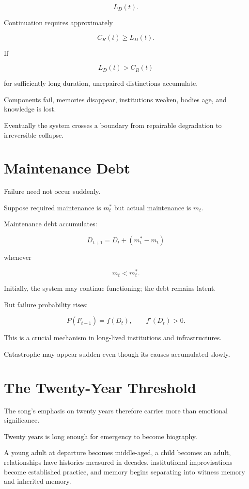 \documentclass[11pt,oneside]{book}
\theoremstyle{definition}
\theoremstyle{remark}
\begin{document}
\[
L_D(t).
\]

Continuation requires approximately

\[
C_R(t)\geq L_D(t).
\]

If

\[
L_D(t)>C_R(t)
\]

for sufficiently long duration, unrepaired distinctions accumulate.

Components fail, memories disappear, institutions weaken, bodies age, and knowledge is lost.

Eventually the system crosses a boundary from repairable degradation to irreversible collapse.

\section{Maintenance Debt}

Failure need not occur suddenly.

Suppose required maintenance is \(m^\ast_t\) but actual maintenance is \(m_t\).

Maintenance debt accumulates:

\[
D_{t+1}
=
D_t+
(m^\ast_t-m_t)
\]

whenever

\[
m_t<m^\ast_t.
\]

Initially, the system may continue functioning; the debt remains latent.

But failure probability rises:

\[
P(F_{t+1})
=
f(D_t),
\qquad
f'(D_t)>0.
\]

This is a crucial mechanism in long-lived institutions and infrastructures.

Catastrophe may appear sudden even though its causes accumulated slowly.

\section{The Twenty-Year Threshold}

The song's emphasis on twenty years therefore carries more than emotional significance.

Twenty years is long enough for emergency to become biography.

A young adult at departure becomes middle-aged, a child becomes an adult, relationships have histories measured in decades, institutional improvisations become established practice, and memory begins separating into witness memory and inherited memory.
\end{document}

